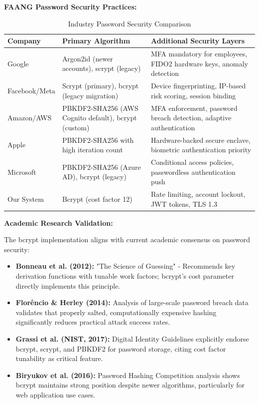 \documentclass[12pt,a4paper]{article}
\begin{document}
\begin{tcolorbox}[colback=primaryblue!5, colframe=primaryblue, boxrule=1pt, arc=3pt, left=10pt, right=10pt, top=8pt, bottom=8pt]
\textbf{FAANG Password Security Practices:}

\begin{table}[H]
\centering
\small
\begin{tabular}{|p{3cm}|p{5cm}|p{5cm}|}
\hline
\textbf{Company} & \textbf{Primary Algorithm} & \textbf{Additional Security Layers} \\
\hline
Google & Argon2id (newer accounts), scrypt (legacy) & MFA mandatory for employees, FIDO2 hardware keys, anomaly detection \\
\hline
Facebook/Meta & Scrypt (primary), bcrypt (legacy migration) & Device fingerprinting, IP-based risk scoring, session binding \\
\hline
Amazon/AWS & PBKDF2-SHA256 (AWS Cognito default), bcrypt (custom) & MFA enforcement, password breach detection, adaptive authentication \\
\hline
Apple & PBKDF2-SHA256 with high iteration count & Hardware-backed secure enclave, biometric authentication priority \\
\hline
Microsoft & PBKDF2-SHA256 (Azure AD), bcrypt (legacy) & Conditional access policies, passwordless authentication push \\
\hline
Our System & Bcrypt (cost factor 12) & Rate limiting, account lockout, JWT tokens, TLS 1.3 \\
\hline
\end{tabular}
\caption{Industry Password Security Comparison}
\end{table}

\vspace{0.5em}

\textbf{Academic Research Validation:}

The bcrypt implementation aligns with current academic consensus on password security:

\begin{itemize}[leftmargin=2em, itemsep=6pt]
    \item \textbf{Bonneau et al. (2012):} "The Science of Guessing" - Recommends key derivation functions with tunable work factors; bcrypt's cost parameter directly implements this principle.
    \item \textbf{Florêncio \& Herley (2014):} Analysis of large-scale password breach data validates that properly salted, computationally expensive hashing significantly reduces practical attack success rates.
    \item \textbf{Grassi et al. (NIST, 2017):} Digital Identity Guidelines explicitly endorse bcrypt, scrypt, and PBKDF2 for password storage, citing cost factor tunability as critical feature.
    \item \textbf{Biryukov et al. (2016):} Password Hashing Competition analysis shows bcrypt maintains strong position despite newer algorithms, particularly for web application use cases.
\end{itemize}


\end{tcolorbox}
\end{document}
